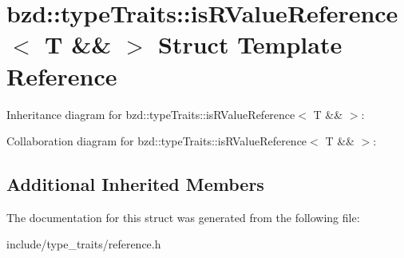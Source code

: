 \hypertarget{structbzd_1_1typeTraits_1_1isRValueReference_3_01T_01_6_6_01_4}{}\section{bzd\+:\+:type\+Traits\+:\+:is\+R\+Value\+Reference$<$ T \&\& $>$ Struct Template Reference}
\label{structbzd_1_1typeTraits_1_1isRValueReference_3_01T_01_6_6_01_4}


Inheritance diagram for bzd\+:\+:type\+Traits\+:\+:is\+R\+Value\+Reference$<$ T \&\& $>$\+:


Collaboration diagram for bzd\+:\+:type\+Traits\+:\+:is\+R\+Value\+Reference$<$ T \&\& $>$\+:
\subsection*{Additional Inherited Members}


The documentation for this struct was generated from the following file\+:\begin{DoxyCompactItemize}
\item 
include/type\+\_\+traits/reference.\+h\end{DoxyCompactItemize}
